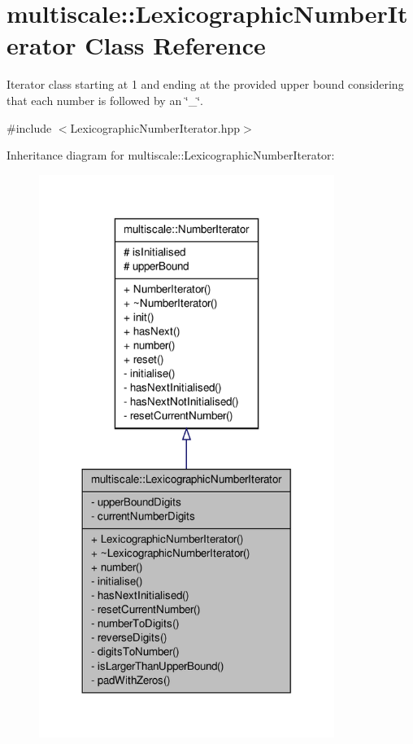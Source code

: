 \hypertarget{classmultiscale_1_1LexicographicNumberIterator}{\section{multiscale\-:\-:\-Lexicographic\-Number\-Iterator \-Class \-Reference}
\label{classmultiscale_1_1LexicographicNumberIterator}
}


\-Iterator class starting at 1 and ending at the provided upper bound considering that each number is followed by an \char`\"{}\-\_\-\char`\"{}.  




{\ttfamily \#include $<$\-Lexicographic\-Number\-Iterator.\-hpp$>$}



\-Inheritance diagram for multiscale\-:\-:\-Lexicographic\-Number\-Iterator\-:
\nopagebreak
\begin{figure}[H]
\begin{center}
\leavevmode
\includegraphics[width=272pt]{classmultiscale_1_1LexicographicNumberIterator__inherit__graph}
\end{center}
\end{figure}


